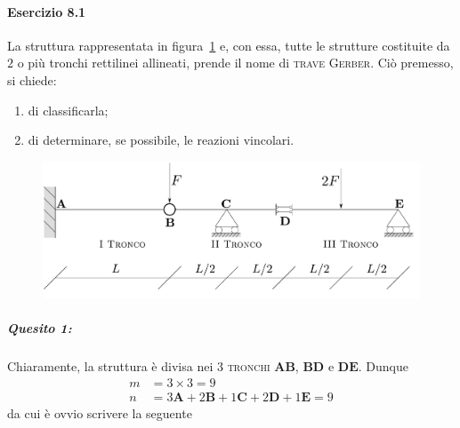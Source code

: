 \paragraph{Esercizio 8.1}
La struttura rappresentata in figura~\ref{Esercizio8-1-1} e, con essa, tutte le strutture costituite da $2$ o più tronchi rettilinei allineati, prende il nome di \textsc{trave Gerber}. Ciò premesso, si chiede:
\begin{enumerate}
\item di classificarla;
\item di determinare, se possibile, le reazioni vincolari.
\end{enumerate}
\renewcommand{\thefigure}{8.1~-~1}
\begin{figure}[ht]
\centering
\includegraphics[width=\textwidth]{Immagini/Parte_8/Esercizio8_1/Esercizio8_1_1.pdf}
\caption{}
\label{Esercizio8-1-1}
\end{figure}
\subparagraph{Quesito 1:}
\noindent Chiaramente, la struttura è divisa nei $3$ \textsc{tronchi} $\mathbf{A}\mathbf{B}$, $\mathbf{B}\mathbf{D}$ e $\mathbf{D}\mathbf{E}$. Dunque
\begin{align*}
m &= 3\times 3 = 9 \\
n &= 3\mathbf{A}+2\mathbf{B}+1\mathbf{C}+2\mathbf{D}+1\mathbf{E} = 9
\end{align*}
\noindent da cui è ovvio scrivere la seguente
